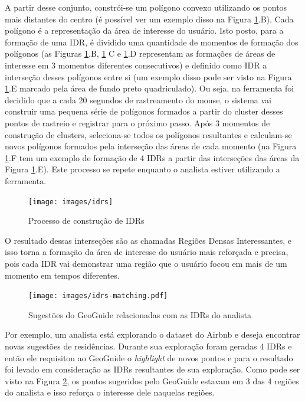 A partir desse conjunto, constrói-se um polígono convexo utilizando os pontos mais distantes do centro (é possível ver um exemplo disso na Figura \ref{fig:idrs-geoguide}.B). Cada polígono é a representação da área de interesse do usuário. Isto posto, para a formação de uma IDR, é dividido uma quantidade de momentos de formação dos polígonos (as Figuras \ref{fig:idrs-geoguide}.B, \ref{fig:idrs-geoguide} C e \ref{fig:idrs-geoguide}.D representam as formações de áreas de interesse em 3 momentos diferentes consecutivos) e definido como IDR a interseção desses polígonos entre si (um exemplo disso pode ser visto na Figura \ref{fig:idrs-geoguide}.E marcado pela área de fundo preto quadriculado). Ou seja, na ferramenta foi decidido que a cada 20 segundos de rastreamento do mouse, o sistema vai construir uma pequena série de polígonos formados a partir do cluster desses pontos de rastreio e registrar para o próximo passo. Após 3 momentos de construção de clusters, seleciona-se todos os polígonos resultantes e calculam-se novos polígonos formados pela interseção das áreas de cada momento (na Figura \ref{fig:idrs-geoguide}.F tem um exemplo de formação de 4 IDRs a partir das interseções das áreas da Figura \ref{fig:idrs-geoguide}.E). Este processo se repete enquanto o analista estiver utilizando a ferramenta.

\begin{figure}[t]
	\centering
	\texttt{[image: images/idrs]}
	\caption{Processo de construção de IDRs}
	\label{fig:idrs-geoguide}
	\vspace{-10pt}
\end{figure}

O resultado dessas interseções são as chamadas Regiões Densas Interessantes, e isso torna a formação da área de interesse do usuário mais reforçada e precisa, pois cada IDR vai demonstrar uma região que o usuário focou em mais de um momento em tempos diferentes.

\begin{figure}[t]
	\centering
	\texttt{[image: images/idrs-matching.pdf]}
	\caption{Sugestões do GeoGuide relacionadas com as IDRs do analista}
	\label{fig:idrs}
	\vspace{-10pt}
\end{figure}

Por exemplo, um analista está explorando o dataset do Airbnb e deseja encontrar novas sugestões de residências. Durante sua exploração foram geradas 4 IDRs e então ele requisitou ao GeoGuide o \textit{highlight} de novos pontos e para o resultado foi levado em consideração as IDRs resultantes de sua exploração. Como pode ser visto na Figura \ref{fig:idrs}, os pontos sugeridos pelo GeoGuide estavam em 3 das 4 regiões do analista e isso reforça o interesse dele naquelas regiões.

